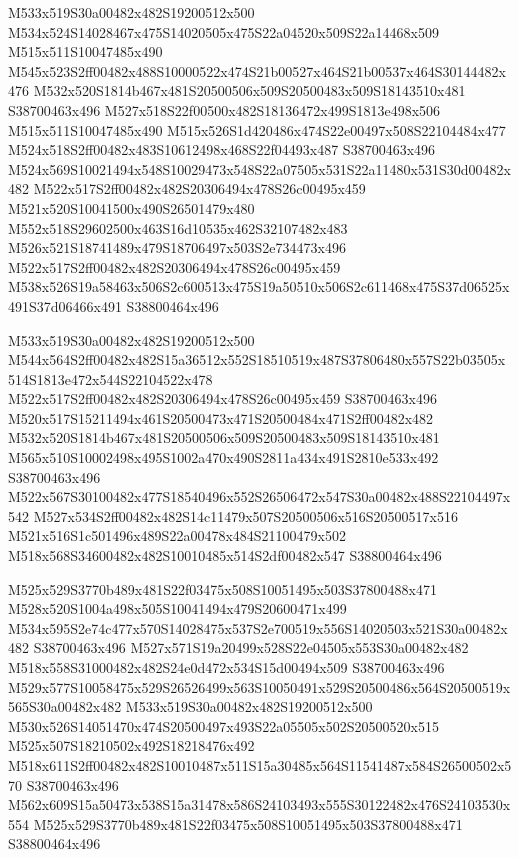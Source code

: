 \documentclass{article}
\begin{document}
\begin{multicols}{2}
M533x519S30a00482x482S19200512x500 M534x524S14028467x475S14020505x475S22a04520x509S22a14468x509 M515x511S10047485x490 M545x523S2ff00482x488S10000522x474S21b00527x464S21b00537x464S30144482x476 M532x520S1814b467x481S20500506x509S20500483x509S18143510x481 S38700463x496 M527x518S22f00500x482S18136472x499S1813e498x506 M515x511S10047485x490 M515x526S1d420486x474S22e00497x508S22104484x477 M524x518S2ff00482x483S10612498x468S22f04493x487 S38700463x496 M524x569S10021494x548S10029473x548S22a07505x531S22a11480x531S30d00482x482 M522x517S2ff00482x482S20306494x478S26c00495x459 M521x520S10041500x490S26501479x480 M552x518S29602500x463S16d10535x462S32107482x483 M526x521S18741489x479S18706497x503S2e734473x496 M522x517S2ff00482x482S20306494x478S26c00495x459 M538x526S19a58463x506S2c600513x475S19a50510x506S2c611468x475S37d06525x491S37d06466x491 S38800464x496

M533x519S30a00482x482S19200512x500 M544x564S2ff00482x482S15a36512x552S18510519x487S37806480x557S22b03505x514S1813e472x544S22104522x478 M522x517S2ff00482x482S20306494x478S26c00495x459 S38700463x496 M520x517S15211494x461S20500473x471S20500484x471S2ff00482x482 M532x520S1814b467x481S20500506x509S20500483x509S18143510x481 M565x510S10002498x495S1002a470x490S2811a434x491S2810e533x492 S38700463x496 M522x567S30100482x477S18540496x552S26506472x547S30a00482x488S22104497x542 M527x534S2ff00482x482S14c11479x507S20500506x516S20500517x516 M521x516S1c501496x489S22a00478x484S21100479x502 M518x568S34600482x482S10010485x514S2df00482x547 S38800464x496

M525x529S3770b489x481S22f03475x508S10051495x503S37800488x471 M528x520S1004a498x505S10041494x479S20600471x499 M534x595S2e74c477x570S14028475x537S2e700519x556S14020503x521S30a00482x482 S38700463x496 M527x571S19a20499x528S22e04505x553S30a00482x482 M518x558S31000482x482S24e0d472x534S15d00494x509 S38700463x496 M529x577S10058475x529S26526499x563S10050491x529S20500486x564S20500519x565S30a00482x482 M533x519S30a00482x482S19200512x500 M530x526S14051470x474S20500497x493S22a05505x502S20500520x515 M525x507S18210502x492S18218476x492 M518x611S2ff00482x482S10010487x511S15a30485x564S11541487x584S26500502x570 S38700463x496 M562x609S15a50473x538S15a31478x586S24103493x555S30122482x476S24103530x554 M525x529S3770b489x481S22f03475x508S10051495x503S37800488x471 S38800464x496


\end{multicols}
\end{document}
